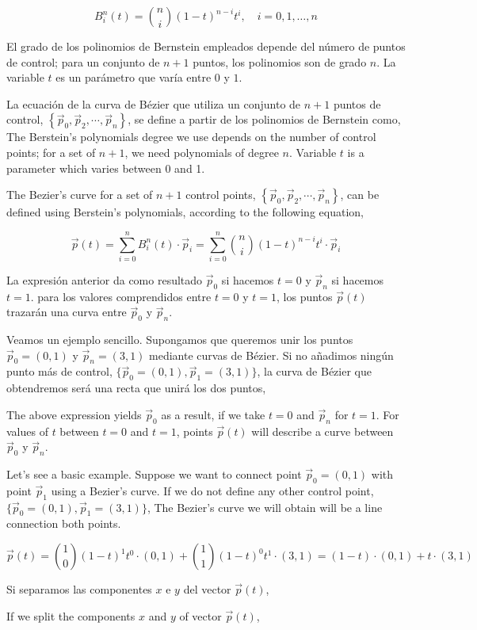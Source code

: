 \begin{equation*}
B_i^n (t)=\binom{n}{i}\left(1-t\right)^{n-i}t^i, \quad i = 0, 1, \dots, n
\end{equation*}
\begin{paracol}{2}
El grado de los polinomios de Bernstein empleados depende del número de puntos de control; para un conjunto de $n+1$ puntos, los polinomios son de grado $n$. La variable $t$ es un parámetro que varía entre $0$ y $1$.

La ecuación de la curva de Bézier que utiliza un conjunto de $n+1$ puntos de control, $\left\lbrace\vec{p}_0, \vec{p}_2, \cdots, \vec{p}_n\right\rbrace$, se define a partir de los polinomios de Bernstein como,
\switchcolumn
The Berstein's polynomials degree we use depends on the number of control points; for a set of $n+1$, we need polynomials of degree $n$. Variable $t$ is a parameter which varies between 0 and 1.

The Bezier's curve for a set of $n+1$ control points,  $\left\lbrace\vec{p}_0, \vec{p}_2, \cdots, \vec{p}_n\right\rbrace$, can be defined using Berstein's polynomials, according to the following equation,  
\end{paracol}
\begin{equation*}
\vec{p}(t) = \sum_{i = 0}^n B_i^n(t) \cdot \vec{p}_i = \sum_{i = 0}^n \binom{n}{i}\left(1-t\right)^{n-i}t^i  \cdot \vec{p}_i
\end{equation*}
\begin{paracol}{2}
La expresión anterior da como resultado $\vec{p}_0$ si hacemos $t = 0$ y $\vec{p}_n$ si hacemos $t = 1$. para los valores comprendidos entre $t=0$ y $t=1$, los puntos $\vec{p}(t)$  trazarán una curva entre $\vec{p}_0$  y $\vec{p}_n$.

Veamos un ejemplo sencillo. Supongamos que queremos unir los puntos $\vec{p}_0 = (0,1)$ y $\vec{p}_n = (3,1)$ mediante curvas de Bézier. Si no añadimos ningún punto más de control, $\lbrace\vec{p}_0 = (0,1), \vec{p}_1 = (3,1)\rbrace$, la curva de Bézier que obtendremos será una recta que unirá los dos puntos,

\switchcolumn
The above expression yields $\vec{p}_0$ as a result, if we take $t=0$ and $\vec{p}_n$ for $t=1$. For values of $t$ between $t=0$ and $t=1$, points $\vec{p}(t)$ will describe a curve between $\vec{p}_0$  y $\vec{p}_n$.  

Let's see a basic example. Suppose we want to connect point $\vec{p}_0 = (0,1)$ with point $\vec{p}_1$ using a Bezier's curve. If we do not define any other control point, $\lbrace\vec{p}_0 = (0,1), \vec{p}_1 = (3,1)\rbrace$, The Bezier's curve we will obtain will be a line connection both points.
\end{paracol}
\begin{equation*}
\vec{p}(t) = \binom{1}{0}\left(1-t\right)^{1}t^0  \cdot (0,1) +  \binom{1}{1}\left(1-t\right)^{0}t^1  \cdot (3,1) = \left(1-t\right)  \cdot (0,1) + t\cdot (3,1)
\end{equation*} 
\begin{paracol}{2}
Si separamos las componentes $x$ e $y$ del vector $\vec{p}(t)$,

\switchcolumn
If we split the components $x$ and $y$ of vector $\vec{p}(t)$,
\end{paracol}

